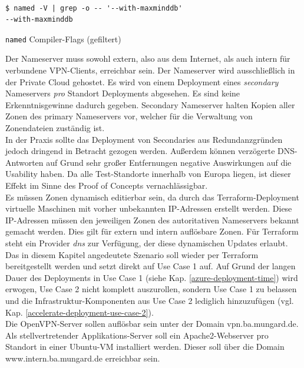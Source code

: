 \begin{listing}[h]
\begin{verbatim}

$ named -V | grep -o -- '--with-maxminddb'
--with-maxminddb

\end{verbatim}
\caption{\texttt{named} Compiler-Flags (gefiltert)}
\label{bind-mmdb-compiler-flag}
\end{listing}
Der Nameserver muss sowohl extern, also aus dem Internet, als auch intern für verbundene VPN-\gls{Client}s, erreichbar sein. Der Nameserver wird ausschließlich in der Private Cloud gehostet. Es wird von einem \gls{Deployment} eines \textit{secondary} Nameservers \textit{pro} Standort \gls{Deployment}s abgesehen. Es sind keine Erkenntnisgewinne dadurch gegeben. Secondary Nameserver halten Kopien aller \gls{Zone}n des primary Nameservers vor, welcher für die Verwaltung von \gls{Zone}ndateien zuständig ist\cite[S.517]{Fall2011}.\\
In der Praxis sollte das \gls{Deployment} von \glqq Secondaries\grqq{} aus Redundanzgründen jedoch dringend in Betracht gezogen werden. Außerdem können \glqq verzögerte\grqq{} \gls{DNS}-Antworten auf Grund sehr großer Entfernungen negative Auswirkungen auf die Usability haben. Da alle Test-Standorte innerhalb von Europa liegen, ist dieser Effekt im Sinne des Proof of Concepts vernachlässigbar.\\
Es müssen \gls{Zone}n dynamisch editierbar sein, da durch das Terraform-\gls{Deployment} virtuelle Maschinen mit vorher unbekannten IP-Adressen erstellt werden. Diese IP-Adressen müssen den jeweiligen \gls{Zone}n des autoritativen Nameservers bekannt gemacht werden. Dies gilt für extern und intern auflösbare \gls{Zone}n. Für Terraform steht ein Provider \textit{dns} zur Verfügung, der diese dynamischen Updates erlaubt\cite{dnstf2021}.
Das in diesem Kapitel angedeutete Szenario soll wieder per Terraform bereitgestellt werden und setzt direkt auf Use Case 1 auf. Auf Grund der langen Dauer des \gls{Deployment}s in Use Case 1 (siehe Kap. \ref{azure-deployment-time}) wird erwogen, Use Case 2 nicht \glqq komplett\grqq{} auszurollen, sondern Use Case 1 zu belassen und die Infrastruktur-Komponenten aus Use Case 2 lediglich hinzuzufügen (vgl. Kap. \ref{accelerate-deployment-use-case-2}).\\
Die OpenVPN-Server sollen auflösbar sein unter der Domain vpn.ba.mungard.de.\\
Als stellvertretender \glqq Applikations-Server\grqq{} soll ein Apache2-Webserver pro Standort in einer Ubuntu-\gls{VM} installiert werden. Dieser soll über die Domain www.intern.ba.mungard.de erreichbar sein.
